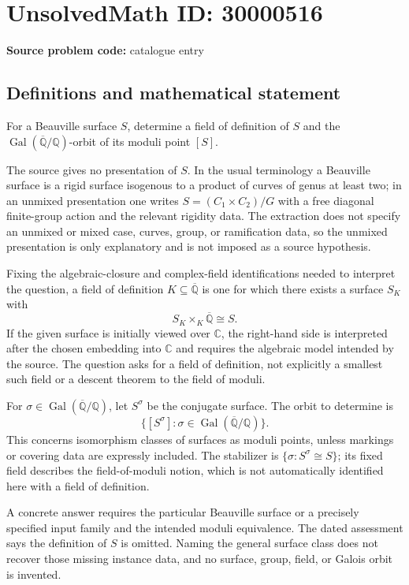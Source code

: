 \documentclass[11pt]{article}
\newcommand{\Q}{\mathbb{Q}}
\newcommand{\C}{\mathbb{C}}
\begin{document}
\section*{UnsolvedMath ID: 30000516}
\textbf{Source problem code:} catalogue entry
\subsection{Definitions and mathematical statement}
For a Beauville surface $S$, determine a field of definition of $S$ and the $\operatorname{Gal}(\overline{\Q}/\Q)$-orbit of its moduli point $[S]$.

The source gives no presentation of $S$. In the usual terminology a Beauville surface is a rigid surface isogenous to a product of curves of genus at least two; in an unmixed presentation one writes $S=(C_1\times C_2)/G$ with a free diagonal finite-group action and the relevant rigidity data. The extraction does not specify an unmixed or mixed case, curves, group, or ramification data, so the unmixed presentation is only explanatory and is not imposed as a source hypothesis.

Fixing the algebraic-closure and complex-field identifications needed to interpret the question, a field of definition $K\subseteq\overline{\Q}$ is one for which there exists a surface $S_K$ with
\[
 S_K\times_K\overline{\Q}\cong S.
\]
If the given surface is initially viewed over $\C$, the right-hand side is interpreted after the chosen embedding into $\C$ and requires the algebraic model intended by the source. The question asks for a field of definition, not explicitly a smallest such field or a descent theorem to the field of moduli.

For $\sigma\in\operatorname{Gal}(\overline{\Q}/\Q)$, let $S^\sigma$ be the conjugate surface. The orbit to determine is
\[
 \{[S^\sigma]:\sigma\in\operatorname{Gal}(\overline{\Q}/\Q)\}.
\]
This concerns isomorphism classes of surfaces as moduli points, unless markings or covering data are expressly included. The stabilizer is $\{\sigma:S^\sigma\cong S\}$; its fixed field describes the field-of-moduli notion, which is not automatically identified here with a field of definition.

A concrete answer requires the particular Beauville surface or a precisely specified input family and the intended moduli equivalence. The dated assessment says the definition of $S$ is omitted. Naming the general surface class does not recover those missing instance data, and no surface, group, field, or Galois orbit is invented.
\end{document}
